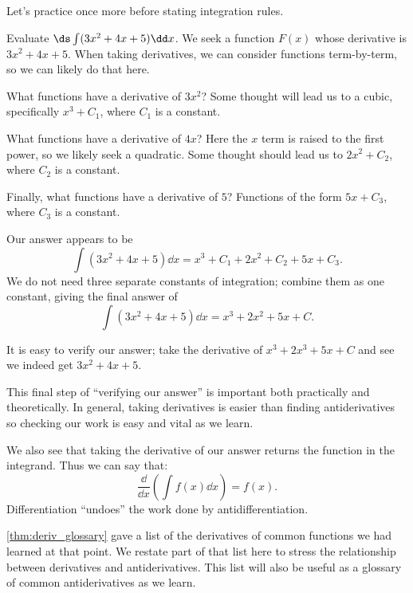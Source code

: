 Let's practice once more before stating integration rules.

\begin{example}\label{ex_anti3}
Evaluate $\ds \int (3x^2 + 4x+5)\dd x$.
\solution
We seek a function $F(x)$ whose derivative is $3x^2+4x+5$. When taking derivatives, we can consider functions term-by-term, so we can likely do that here.

What functions have a derivative of $3x^2$? Some thought will lead us to a cubic, specifically $x^3+C_1$, where $C_1$ is a constant. 

What functions have a derivative of $4x$? Here the $x$ term is raised to the first power, so we likely seek a quadratic. Some thought should lead us to $2x^2+C_2$, where $C_2$ is a constant.

Finally, what functions have a derivative of $5$? Functions of the form $5x+C_3$, where $C_3$ is a constant.

Our answer appears to be 
\[\int (3x^2+4x+5)\dd x = x^3+C_1+2x^2+C_2+5x+C_3.\]
We do not need three separate constants of integration; combine them as one constant, giving the final answer of 
\[\int (3x^2+4x+5)\dd x = x^3+2x^2+5x+C.\]

It is easy to verify our answer; take the derivative of $x^3+2x^3+5x+C$ and see we indeed get $3x^2+4x+5$.
\end{example}

This final step of ``verifying our answer'' is important both practically and theoretically. In general, taking derivatives is easier than finding antiderivatives so checking our work is easy and vital as we learn.

We also see that taking the derivative of our answer returns the function in the integrand. Thus we can say that:
\[\frac{\dd}{\dd x}\left(\int f(x)\dd x\right) = f(x).\]
Differentiation ``undoes'' the work done by antidifferentiation. 

\autoref{thm:deriv_glossary} gave a list of the derivatives of common functions we had learned at that point. We restate part of that list here to stress the relationship between derivatives and antiderivatives. This list will also be useful as a glossary of common antiderivatives as we learn.

